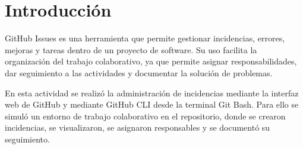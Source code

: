 \section{Introducción}

GitHub Issues es una herramienta que permite gestionar incidencias, errores, mejoras y tareas dentro de un proyecto de software. Su uso facilita la organización del trabajo colaborativo, ya que permite asignar responsabilidades, dar seguimiento a las actividades y documentar la solución de problemas.

En esta actividad se realizó la administración de incidencias mediante la interfaz web de GitHub y mediante GitHub CLI desde la terminal Git Bash. Para ello se simuló un entorno de trabajo colaborativo en el repositorio, donde se crearon incidencias, se visualizaron, se asignaron responsables y se documentó su seguimiento.